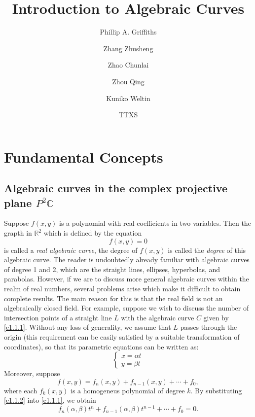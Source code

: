 \documentclass{book}
\title{Introduction to Algebraic Curves}
\author{Phillip A. Griffiths}
\author{Zhang Zhusheng}
\author{Zhao Chunlai}
\author{Zhou Qing}
\author{Kuniko Weltin}
\author{TTXS}
\affil{ttxs@pku.edu.cn}
\def\R{\mathbb{R}}
\def\C{\mathbb{C}}
\begin{document}
    \maketitle
    \tableofcontents
    \chapter{Fundamental Concepts}
    \section{Algebraic curves in the complex projective plane \texorpdfstring{$P^2\C$}{P2C}}
    Suppose $f(x,y)$ is a polynomial with real coefficients in two variables. Then the grapth in $\R^2$ which is defined by the equation 
    \begin{equation}\label{e1.1.1}
        f(x,y)=0
    \end{equation}
    is called a \textit{real algebraic curve}, the degree of $f(x,y)$ is called the \textit{degree} of this algebraic curve. The reader is undoubtedly already familiar with algebraic curves of degree 1 and 2, which are the straight lines, ellipses, hyperbolas, and parabolas. However, if we are to discuss more general algebraic curves within the realm of real numbers, several problems arise which make it difficult to obtain complete results. The main reason for this is that the real field is not an algebraically closed field. For example, suppose we wish to discuss the number of intersection points of a straight line $L$ with the algebraic curve $C$ given by \eqref{e1.1.1}. Without any loss of generality, we assume that $L$ passes through the origin (this requirement can be easily satisfied by a suitable transformation of coordinates), so that its parametric equations can be written as: 
    \begin{equation}\label{e1.1.2}
        \begin{cases}
            x=\alpha t\\
            y=\beta t
        \end{cases}
    \end{equation}
    Moreover, suppose 
    $$f(x,y)=f_n(x,y)+f_{n-1}(x,y)+\cdots+f_0, $$
    where each $f_k(x,y)$ is a homogeneus polynomial of degree $k$. By substituting \eqref{e1.1.2} into \eqref{e1.1.1}, we obtain 
    \begin{equation}\label{e1.1.3}
        f_n(\alpha,\beta)t^n+f_{n-1}(\alpha,\beta)t^{n-1}+\cdots+f_0=0. 
    \end{equation}
\end{document}
